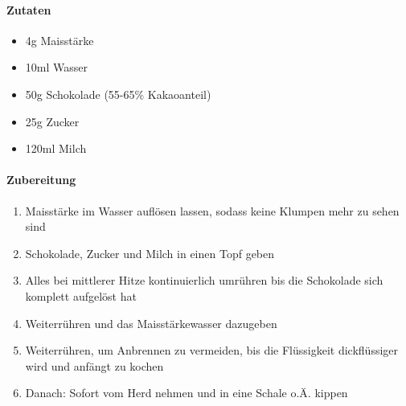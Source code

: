 \newpage
{}
\paragraph{Zutaten}
\begin{itemize}
	\item 4g Maisstärke
	\item 10ml Wasser
	\item 50g Schokolade (55-65\% Kakaoanteil)
	\item 25g Zucker
	\item 120ml Milch
\end{itemize}


\paragraph{Zubereitung}
\begin{enumerate}[noitemsep]
	\item Maisstärke im Wasser auflösen lassen, sodass keine Klumpen mehr zu sehen sind
	\item Schokolade, Zucker und Milch in einen Topf geben 
	\item Alles bei mittlerer Hitze kontinuierlich umrühren bis die Schokolade sich komplett aufgelöst hat
	\item Weiterrühren und das Maisstärkewasser dazugeben
	\item Weiterrühren, um Anbrennen zu vermeiden, bis die Flüssigkeit dickflüssiger wird und anfängt zu kochen
	\item Danach: Sofort vom Herd nehmen und in eine Schale o.Ä. kippen
\end{enumerate}
